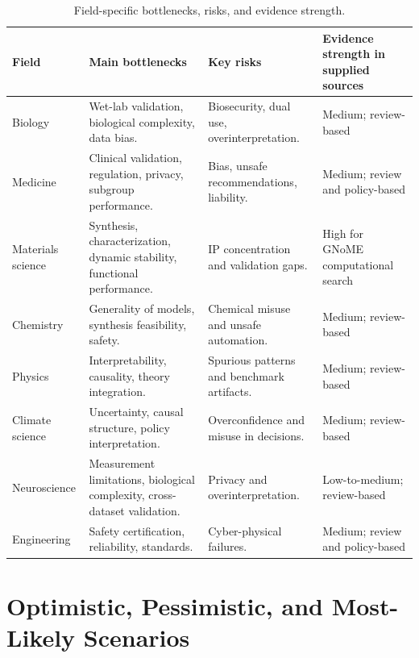 \documentclass[12pt]{article}
\begin{document}
\begin{table}[H]
\centering
\caption{Field-specific bottlenecks, risks, and evidence strength.}
\small
\begin{tabularx}{\textwidth}{p{2.5cm}X X p{2.6cm}}
\toprule
\textbf{Field} & \textbf{Main bottlenecks} & \textbf{Key risks} & \textbf{Evidence strength in supplied sources} \\
\midrule
Biology & Wet-lab validation, biological complexity, data bias. & Biosecurity, dual use, overinterpretation. & Medium; review-based \\
Medicine & Clinical validation, regulation, privacy, subgroup performance. & Bias, unsafe recommendations, liability. & Medium; review and policy-based \\
Materials science & Synthesis, characterization, dynamic stability, functional performance. & IP concentration and validation gaps. & High for GNoME computational search \cite{ref6} \\
Chemistry & Generality of models, synthesis feasibility, safety. & Chemical misuse and unsafe automation. & Medium; review-based \cite{ref5} \\
Physics & Interpretability, causality, theory integration. & Spurious patterns and benchmark artifacts. & Medium; review-based \\
Climate science & Uncertainty, causal structure, policy interpretation. & Overconfidence and misuse in decisions. & Medium; review-based \\
Neuroscience & Measurement limitations, biological complexity, cross-dataset validation. & Privacy and overinterpretation. & Low-to-medium; review-based \\
Engineering & Safety certification, reliability, standards. & Cyber-physical failures. & Medium; review and policy-based \\
\bottomrule
\end{tabularx}
\end{table}

\section{Optimistic, Pessimistic, and Most-Likely Scenarios}
\end{document}

